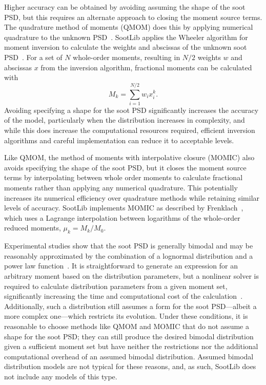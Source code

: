 \documentclass[preprint,letterpaper]{elsarticle}
\begin{document}
Higher accuracy can be obtained by avoiding assuming the shape of the soot PSD, but this requires an alternate approach to closing the moment source terms. The quadrature method of moments (QMOM) does this by applying numerical quadrature to the unknown PSD~\cite{McGraw_1997}. SootLib applies the Wheeler algorithm for moment inversion to calculate the weights and abscissas of the unknown soot PSD~\cite{Marchisio_2013,Wheeler_1974}. For a set of $N$ whole-order moments, resulting in $N/2$ weights $w$ and abscissas $x$ from the inversion algorithm, fractional moments can be calculated with
\begin{equation}
    M_k = \sum_{i=1}^{N/2} w_i x_i^k.
\end{equation}
Avoiding specifying a shape for the soot PSD significantly increases the accuracy of the model, particularly when the distribution increases in complexity, and while this does increase the computational resources required, efficient inversion algorithms and careful implementation can reduce it to acceptable levels.

Like QMOM, the method of moments with interpolative closure (MOMIC) also avoids specifying the shape of the soot PSD, but it closes the moment source terms by interpolating between whole order moments to calculate fractional moments rather than applying any numerical quadrature. This potentially increases its numerical efficiency over quadrature methods while retaining similar levels of accuracy. SootLib implements MOMIC as described by Frenklach~\cite{Frenklach_2002b,Frenklach_1987}, which uses a Lagrange interpolation between logarithms of the  whole-order reduced moments, $\mu_k = M_k/M_0$.

Experimental studies show that the soot PSD is generally bimodal and may be reasonably approximated by the combination of a lognormal distribution and a power law function~\cite{Wang_2011}. It is straightforward to generate an expression for an arbitrary moment based on the distribution parameters, but a nonlinear solver is required to calculate distribution parameters from a given moment set, significantly increasing the time and computational cost of the calculation~\cite{Lignell_2008b}. Additionally, such a distribution still assumes a form for the soot PSD---albeit a more complex one---which restricts its evolution. Under these conditions, it is reasonable to choose methods like QMOM and MOMIC that do not assume a shape for the soot PSD; they can still produce the desired bimodal distribution given a sufficient moment set but have neither the restrictions nor the additional computational overhead of an assumed bimodal distribution. Assumed bimodal distribution models are not typical for these reasons, and, as such, SootLib does not include any models of this type.
\end{document}
